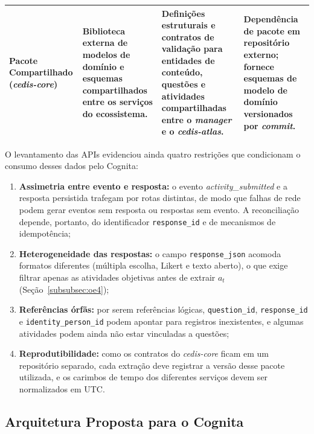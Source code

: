 {\begin{longtable}{>{\raggedright\arraybackslash}p{2.6cm}>{\raggedright\arraybackslash}p{3.4cm}>{\raggedright\arraybackslash}p{4.3cm}>{\raggedright\arraybackslash}p{3.5cm}}
\hline
\textbf{Pacote Compartilhado} (\textit{cedis-core}) & Biblioteca externa de modelos de domínio e esquemas compartilhados entre os serviços do ecossistema. & Definições estruturais e contratos de validação para entidades de conteúdo, questões e atividades compartilhadas entre o \textit{manager} e o \textit{cedis-atlas}. & Dependência de pacote em repositório externo; fornece esquemas de modelo de domínio versionados por \textit{commit}. \\
\hline
\end{longtable}
}

O levantamento das APIs evidenciou ainda quatro restrições que condicionam o consumo desses dados pelo Cognita:

\begin{enumerate}
    \item \textbf{Assimetria entre evento e resposta:} o evento \textit{activity\_submitted} e a resposta persistida trafegam por rotas distintas, de modo que falhas de rede podem gerar eventos sem resposta ou respostas sem evento. A reconciliação depende, portanto, do identificador \texttt{response\_id} e de mecanismos de idempotência;
    \item \textbf{Heterogeneidade das respostas:} o campo \texttt{response\_json} acomoda formatos diferentes (múltipla escolha, Likert e texto aberto), o que exige filtrar apenas as atividades objetivas antes de extrair $a_t$ (Seção~\ref{subsubsec:oe4});
    \item \textbf{Referências órfãs:} por serem referências lógicas, \texttt{question\_id}, \texttt{response\_id} e \texttt{identity\_person\_id} podem apontar para registros inexistentes, e algumas atividades podem ainda não estar vinculadas a questões;
    \item \textbf{Reprodutibilidade:} como os contratos do \textit{cedis-core} ficam em um repositório separado, cada extração deve registrar a versão desse pacote utilizada, e os carimbos de tempo dos diferentes serviços devem ser normalizados em UTC.
\end{enumerate}

\subsection{Arquitetura Proposta para o Cognita}
\label{subsec:arquitetura-proposta}

